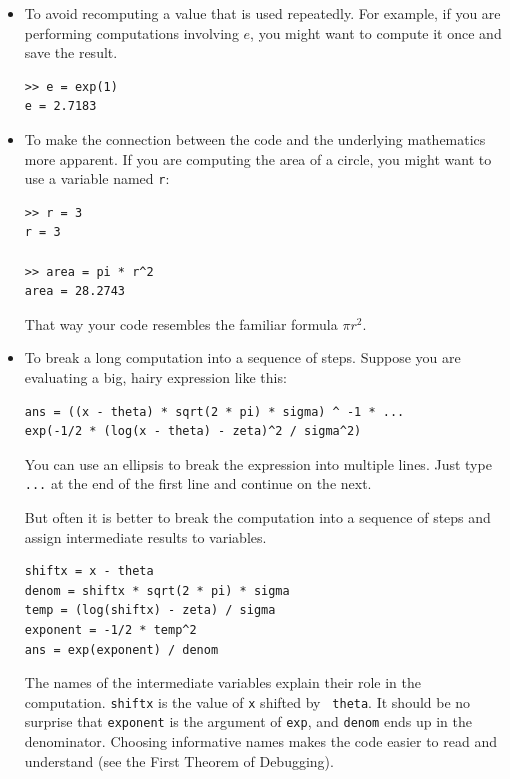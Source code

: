 \documentclass[
]{book}
\begin{document}
\begin{itemize}

\item To avoid recomputing a value that is used repeatedly.  For
example, if you are performing computations involving $e$, you might
want to compute it once and save the result.

\begin{verbatim}
>> e = exp(1)
e = 2.7183
\end{verbatim}


\item To make the connection between the code and the underlying
mathematics more apparent.  If you are computing the area of a circle,
you might want to use a variable named {\tt r}:

\begin{verbatim}
>> r = 3
r = 3

>> area = pi * r^2
area = 28.2743
\end{verbatim}

That way your code resembles the familiar formula $\pi r^2$.

\item To break a long computation into a sequence of steps.
Suppose you are evaluating a big, hairy expression like this:

\begin{verbatim}
ans = ((x - theta) * sqrt(2 * pi) * sigma) ^ -1 * ...
exp(-1/2 * (log(x - theta) - zeta)^2 / sigma^2)
\end{verbatim}

You can use an ellipsis to break the expression into multiple lines.
Just type {\tt ...} at the end of the first line and continue on the
next.

But often it is better to break the computation into a sequence of
steps and assign intermediate results to variables.

\begin{verbatim}
shiftx = x - theta
denom = shiftx * sqrt(2 * pi) * sigma
temp = (log(shiftx) - zeta) / sigma
exponent = -1/2 * temp^2
ans = exp(exponent) / denom
\end{verbatim}

The names of the intermediate variables explain their role in the
computation.  {\tt shiftx} is the value of {\tt x} shifted by {\tt
theta}.  It should be no surprise that {\tt exponent} is the argument
of {\tt exp}, and {\tt denom} ends up in the denominator.  Choosing
informative names makes the code easier to read and understand (see
the First Theorem of Debugging).

\end{itemize}
\end{document}

